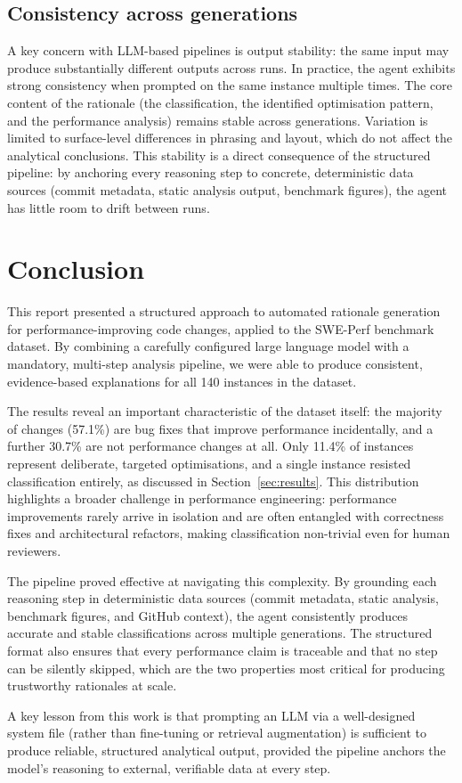 \documentclass[12pt, a4paper]{article}
\begin{document}
\subsection*{Consistency across generations}

A key concern with LLM-based pipelines is output stability: the same input may produce substantially different outputs across runs.
In practice, the agent exhibits strong consistency when prompted on the same instance multiple times.
The core content of the rationale (the classification, the identified optimisation pattern, and the performance analysis) remains stable across generations.
Variation is limited to surface-level differences in phrasing and layout, which do not affect the analytical conclusions.
This stability is a direct consequence of the structured pipeline: by anchoring every reasoning step to concrete, deterministic data sources (commit metadata, static analysis output, benchmark figures), the agent has little room to drift between runs.

\section{Conclusion}
\label{sec:conclusion}

This report presented a structured approach to automated rationale generation for performance-improving code changes, applied to the SWE-Perf benchmark dataset.
By combining a carefully configured large language model with a mandatory, multi-step analysis pipeline, we were able to produce consistent, evidence-based explanations for all 140 instances in the dataset.

The results reveal an important characteristic of the dataset itself: the majority of changes (57.1\%) are bug fixes that improve performance incidentally, and a further 30.7\% are not performance changes at all.
Only 11.4\% of instances represent deliberate, targeted optimisations, and a single instance resisted classification entirely, as discussed in Section~\ref{sec:results}.
This distribution highlights a broader challenge in performance engineering: performance improvements rarely arrive in isolation and are often entangled with correctness fixes and architectural refactors, making classification non-trivial even for human reviewers.

The pipeline proved effective at navigating this complexity.
By grounding each reasoning step in deterministic data sources (commit metadata, static analysis, benchmark figures, and GitHub context), the agent consistently produces accurate and stable classifications across multiple generations.
The structured format also ensures that every performance claim is traceable and that no step can be silently skipped, which are the two properties most critical for producing trustworthy rationales at scale.

A key lesson from this work is that prompting an LLM via a well-designed system file (rather than fine-tuning or retrieval augmentation) is sufficient to produce reliable, structured analytical output, provided the pipeline anchors the model's reasoning to external, verifiable data at every step.



\end{document}

